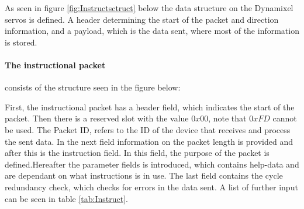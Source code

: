 As seen in figure \ref{fig:Instructsctruct} below the data structure on the Dynamixel servos is defined. A header determining the start of the packet and direction information, and a payload, which is the data sent, where most of the information is stored. 
\paragraph{The instructional packet} consists of the structure seen in the figure below:

First, the instructional packet has a header field, which indicates the start of the packet. Then there is a reserved slot with the value $0x00$, note that $0xFD$ cannot be used.  The Packet ID, refers to the ID of the device that receives and process the sent data. In the next field information on the packet length is provided and after this is the instruction field. In this field, the purpose of the packet is defined.Hereafter the parameter fields is introduced, which contains help-data and are dependant on what instructions is in use. The last field contains the cycle redundancy check, which checks for errors in the data sent.  A list of further input can be seen in table \ref{tab:Instruct}.

